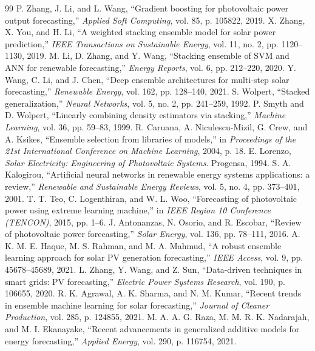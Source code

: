 \documentclass[conference]{IEEEtran}
\begin{document}
\begin{thebibliography}{99}
 P. Zhang, J. Li, and L. Wang, ``Gradient boosting for photovoltaic power output forecasting,'' \textit{Applied Soft Computing}, vol. 85, p. 105822, 2019.
 X. Zhang, X. You, and H. Li, ``A weighted stacking ensemble model for solar power prediction,'' \textit{IEEE Transactions on Sustainable Energy}, vol. 11, no. 2, pp. 1120--1130, 2019.
 M. Li, D. Zhang, and Y. Wang, ``Stacking ensemble of SVM and ANN for renewable forecasting,'' \textit{Energy Reports}, vol. 6, pp. 212--220, 2020.
 Y. Wang, C. Li, and J. Chen, ``Deep ensemble architectures for multi-step solar forecasting,'' \textit{Renewable Energy}, vol. 162, pp. 128--140, 2021.
 S. Wolpert, ``Stacked generalization,'' \textit{Neural Networks}, vol. 5, no. 2, pp. 241--259, 1992.
 P. Smyth and D. Wolpert, ``Linearly combining density estimators via stacking,'' \textit{Machine Learning}, vol. 36, pp. 59--83, 1999.
 R. Caruana, A. Niculescu-Mizil, G. Crew, and A. Ksikes, ``Ensemble selection from libraries of models,'' in \textit{Proceedings of the 21st International Conference on Machine Learning}, 2004, p. 18.
 E. Lorenzo, \textit{Solar Electricity: Engineering of Photovoltaic Systems}. Progensa, 1994.
 S. A. Kalogirou, ``Artificial neural networks in renewable energy systems applications: a review,'' \textit{Renewable and Sustainable Energy Reviews}, vol. 5, no. 4, pp. 373--401, 2001.
 T. T. Teo, C. Logenthiran, and W. L. Woo, ``Forecasting of photovoltaic power using extreme learning machine,'' in \textit{IEEE Region 10 Conference (TENCON)}, 2015, pp. 1--6.
 J. Antonanzas, N. Osorio, and R. Escobar, ``Review of photovoltaic power forecasting,'' \textit{Solar Energy}, vol. 136, pp. 78--111, 2016.
 A. K. M. E. Haque, M. S. Rahman, and M. A. Mahmud, ``A robust ensemble learning approach for solar PV generation forecasting,'' \textit{IEEE Access}, vol. 9, pp. 45678--45689, 2021.
 L. Zhang, Y. Wang, and Z. Sun, ``Data-driven techniques in smart grids: PV forecasting,'' \textit{Electric Power Systems Research}, vol. 190, p. 106655, 2020.
 R. K. Agrawal, A. K. Sharma, and N. M. Kumar, ``Recent trends in ensemble machine learning for solar forecasting,'' \textit{Journal of Cleaner Production}, vol. 285, p. 124855, 2021.
 M. A. A. G. Raza, M. M. R. K. Nadarajah, and M. I. Ekanayake, ``Recent advancements in generalized additive models for energy forecasting,'' \textit{Applied Energy}, vol. 290, p. 116754, 2021.

\end{thebibliography}
\end{document}
